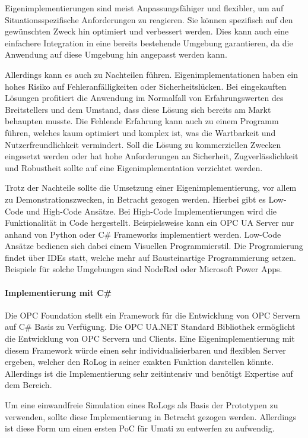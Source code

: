 \documentclass[a4paper, 12pt, oneside, toc=listofnumbered, bibliography=totoc]{scrbook}
\begin{document}
			Eigenimplementierungen sind meist Anpassungsfähiger und flexibler, um auf Situationsspezifische Anforderungen zu reagieren. Sie können spezifisch auf den gewünschten Zweck hin optimiert und verbessert werden. Dies kann auch eine einfachere Integration in eine bereits bestehende Umgebung garantieren, da die Anwendung auf diese Umgebung hin angepasst werden kann.
			
			Allerdings kann es auch zu Nachteilen führen. Eigenimplementationen haben ein hohes Risiko auf Fehleranfälligkeiten oder Sicherheitslücken. Bei eingekauften Lösungen profitiert die Anwendung im Normalfall von Erfahrungswerten des Breitstellers und dem Umstand, dass diese Lösung sich bereits am Markt behaupten musste. Die Fehlende Erfahrung kann auch zu einem Programm führen, welches kaum optimiert und komplex ist, was die Wartbarkeit und Nutzerfreundlichkeit vermindert. Soll die Lösung zu kommerziellen Zwecken eingesetzt werden oder hat hohe Anforderungen an Sicherheit, Zugverlässlichkeit und Robustheit sollte auf eine Eigenimplementation verzichtet werden.
			
			Trotz der Nachteile sollte die Umsetzung einer Eigenimplementierung, vor allem zu Demonstrationszwecken, in Betracht gezogen werden. Hierbei gibt es Low-Code und High-Code Ansätze. Bei High-Code Implementierungen wird die Funktionalität in Code hergestellt. Beispielsweise kann ein OPC UA Server nur anhand von Python oder C\# Frameworks implementiert werden. Low-Code Ansätze bedienen sich dabei einem Visuellen Programmierstil. Die Programierung findet über IDEs statt, welche mehr auf Bausteinartige Programmierung setzen. Beispiele für solche Umgebungen sind NodeRed oder Microsoft Power Apps. 
			
			\paragraph{Implementierung mit C\#}
			Die OPC Foundation stellt ein Framework für die Entwicklung von OPC Servern auf C\# Basis zu Verfügung. Die OPC UA.NET Standard Bibliothek ermöglicht die Entwicklung von OPC Servern und Clients. Eine Eigenimplementierung mit diesem Framework würde einen sehr individualisierbaren und flexiblen Server ergeben, welcher den RoLog in seiner exakten Funktion darstellen könnte. Allerdings ist die Implementierung sehr zeitintensiv und benötigt Expertise auf dem Bereich. \cite{noauthor_opc_nodate-1}
			
			Um eine einwandfreie Simulation eines RoLogs als Basis der Prototypen zu verwenden, sollte diese Implementierung in Betracht gezogen werden. Allerdings ist diese Form um einen ersten \ac{PoC} für Umati zu entwerfen zu aufwendig.
			
\end{document}
